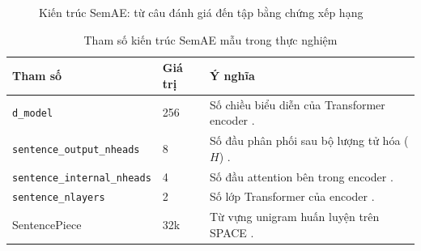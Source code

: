 \begin{figure}[htbp]
\centering
\begin{adjustbox}{max width=\textwidth}
\end{adjustbox}
\caption{Kiến trúc SemAE: từ câu đánh giá đến tập bằng chứng xếp hạng \cite{angelidis2021extractive}}
\label{fig:semae-architecture}
\end{figure}

\begin{table}[htbp]
\centering
\caption{Tham số kiến trúc SemAE mẫu trong thực nghiệm}
\label{tab:semae-params}
\small
\begin{tabularx}{\textwidth}{L{0.28\textwidth} L{0.14\textwidth} Y}
\toprule
\textbf{Tham số} & \textbf{Giá trị} & \textbf{Ý nghĩa} \\
\midrule
\texttt{d\_model} & 256 & Số chiều biểu diễn của Transformer encoder \cite{angelidis2021extractive}. \\
\texttt{sentence\_output\_nheads} & 8 & Số đầu phân phối sau bộ lượng tử hóa ($H$) \cite{angelidis2021extractive}. \\
\texttt{sentence\_internal\_nheads} & 4 & Số đầu attention bên trong encoder \cite{angelidis2021extractive}. \\
\texttt{sentence\_nlayers} & 2 & Số lớp Transformer của encoder \cite{angelidis2021extractive}. \\
SentencePiece & 32k & Từ vựng unigram huấn luyện trên SPACE \cite{kudo2018sentencepiece, angelidis2021extractive}. \\
\bottomrule
\end{tabularx}
\end{table}

